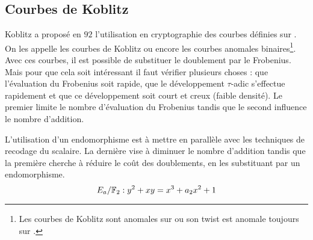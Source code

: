 \documentclass[a4paper]{report}
\begin{document}
\subsection{Courbes de Koblitz}
Koblitz a proposé en $92$ l'utilisation en cryptographie des courbes définies sur . On les appelle les courbes de Koblitz ou encore les courbes anomales binaires\footnote{Les courbes de Koblitz sont anomales sur  ou son twist est anomale toujours sur .}. Avec ces courbes, il est possible de substituer le doublement par le Frobenius. Mais pour que cela soit intéressant il faut vérifier plusieurs choses : que l'évaluation du Frobenius soit rapide, que le développement $\tau$-adic s'effectue rapidement et que ce développement soit court et creux (faible densité). Le premier limite le nombre d'évaluation du Frobenius tandis que le second influence le nombre d'addition.

L'utilisation d'un endomorphisme est à mettre en parallèle avec les techniques de recodage du scalaire. La dernière vise à diminuer le nombre d'addition tandis que la première cherche à réduire le coût des doublements, en les substituant par un endomorphisme. 
\begin{equation}
E_a / \mathbb{F}_{2} : y^2 + xy = x^3 + a_2x^2 + 1
\end{equation}
\end{document}
